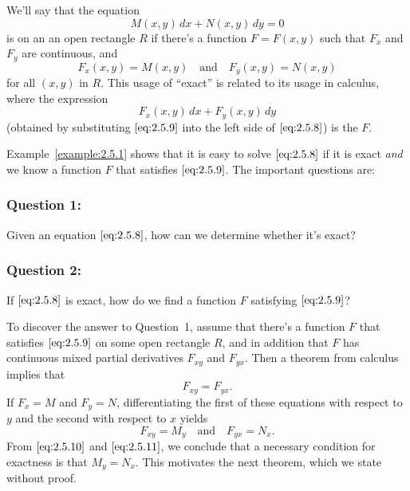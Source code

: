 \documentclass{ximera}
\begin{document}
 
We'll say that  the equation
\begin{equation} \label{eq:2.5.8}
M(x,y)\,dx+N(x,y)\,dy=0
\end{equation}
 is   on an an open rectangle  $R$ if there's
a function $F=F(x,y)$ such  that $F_x$
and $F_y$  are continuous, and
\begin{equation} \label{eq:2.5.9}
F_x(x,y)=M(x,y) \quad \text{and}\quad F_y(x,y)=N(x,y)
\end{equation}
for  all  $(x,y)$ in $R$.
This usage of ``exact'' is related  to its usage in calculus,
where the expression
$$
F_x(x,y)\,dx+F_y(x,y)\,dy
$$
(obtained by substituting $\eqref{eq:2.5.9}$ into the left side of
$\eqref{eq:2.5.8}$) is the   $F$.
 
Example~\ref{example:2.5.1} shows that it is easy to solve
$\eqref{eq:2.5.8}$
if it is exact \textit{and}  we know a function $F$ that satisfies
$\eqref{eq:2.5.9}$. The important questions are:
 
 \subsubsection*{Question 1:}  Given an equation
$\eqref{eq:2.5.8}$, how can we determine whether it's  exact?
 
 \subsubsection*{Question 2:} If $\eqref{eq:2.5.8}$ is exact, how do we find
a function $F$ satisfying $\eqref{eq:2.5.9}$?
 
To discover the answer to Question~1,
 assume that  there's a function $F$  that satisfies $\eqref{eq:2.5.9}$ on
some open rectangle $R$, and in addition that $F$ has continuous mixed
partial derivatives $F_{xy}$ and $F_{yx}$.  Then a theorem from calculus
implies that
\begin{equation} \label{eq:2.5.10}
F_{xy}=F_{yx}.
\end{equation}
If $F_x=M$ and $F_y=N$,
differentiating the first of these equations with respect to
$y$ and the second with respect to $x$ yields
\begin{equation} \label{eq:2.5.11}
F_{xy}=M_y\quad\mbox{and}\quad  F_{yx}=N_x.
\end{equation}
From  $\eqref{eq:2.5.10}$  and $\eqref{eq:2.5.11}$, we conclude that
 a necessary condition for exactness is that $M_y=N_x$.
This motivates the next theorem, which we state without proof.
 
\end{document}
